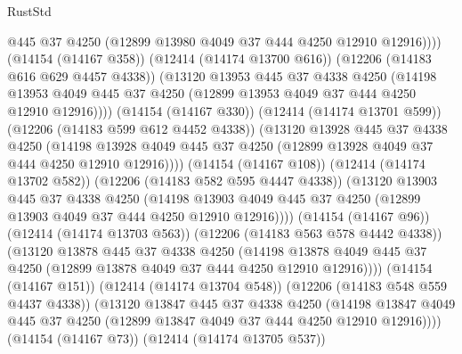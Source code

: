 \begin{lexlean}{RustStd}
\begin{coremodule}
{\begin{coremodule}
{{{{{{{{{{{{{{{{{{{{{{{{{{{{{{{{{{{{{{{{{{{{{{{{{{                        @445
                        @37
                        @4250
                        (@12899 @13980 @4049 @37 @444 @4250 @12910 @12916))))
                  (@14154 (@14167 @358))
                  (@12414 (@14174 @13700 @616))
                  (@12206 (@14183 @616 @629 @4457 @4338))
                  (@13120
                    @13953
                    @445
                    @37
                    @4338
                    @4250
                    (@14198
                      @13953
                      @4049
                      @445
                      @37
                      @4250
                      (@12899 @13953 @4049 @37 @444 @4250 @12910 @12916))))
                (@14154 (@14167 @330))
                (@12414 (@14174 @13701 @599))
                (@12206 (@14183 @599 @612 @4452 @4338))
                (@13120
                  @13928
                  @445
                  @37
                  @4338
                  @4250
                  (@14198
                    @13928
                    @4049
                    @445
                    @37
                    @4250
                    (@12899 @13928 @4049 @37 @444 @4250 @12910 @12916))))
              (@14154 (@14167 @108))
              (@12414 (@14174 @13702 @582))
              (@12206 (@14183 @582 @595 @4447 @4338))
              (@13120
                @13903
                @445
                @37
                @4338
                @4250
                (@14198
                  @13903
                  @4049
                  @445
                  @37
                  @4250
                  (@12899 @13903 @4049 @37 @444 @4250 @12910 @12916))))
            (@14154 (@14167 @96))
            (@12414 (@14174 @13703 @563))
            (@12206 (@14183 @563 @578 @4442 @4338))
            (@13120
              @13878
              @445
              @37
              @4338
              @4250
              (@14198
                @13878
                @4049
                @445
                @37
                @4250
                (@12899 @13878 @4049 @37 @444 @4250 @12910 @12916))))
          (@14154 (@14167 @151))
          (@12414 (@14174 @13704 @548))
          (@12206 (@14183 @548 @559 @4437 @4338))
          (@13120
            @13847
            @445
            @37
            @4338
            @4250
            (@14198
              @13847
              @4049
              @445
              @37
              @4250
              (@12899 @13847 @4049 @37 @444 @4250 @12910 @12916))))
        (@14154 (@14167 @73))
        (@12414 (@14174 @13705 @537))
}}}}}}}}}}}}}}}}}}}}}}}}}}}}}}}}}}}}}}}}}}}}}}}}}}
\end{coremodule}}
\end{coremodule}
\end{lexlean}

